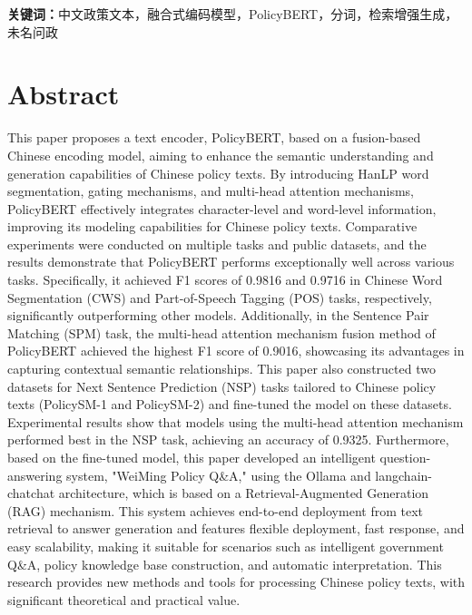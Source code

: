 \documentclass[12pt, a4paper]{ctexart}
\begin{document}
\vspace{2em} %

\textbf{关键词：}中文政策文本，融合式编码模型，PolicyBERT，分词，检索增强生成，未名问政
\vspace{2em} %

\newpage
\section*{Abstract}
This paper proposes a text encoder, PolicyBERT, based on a fusion-based Chinese encoding model, aiming to enhance the semantic understanding and generation capabilities of Chinese policy texts. By introducing HanLP word segmentation, gating mechanisms, and multi-head attention mechanisms, PolicyBERT effectively integrates character-level and word-level information, improving its modeling capabilities for Chinese policy texts. Comparative experiments were conducted on multiple tasks and public datasets, and the results demonstrate that PolicyBERT performs exceptionally well across various tasks. Specifically, it achieved F1 scores of 0.9816 and 0.9716 in Chinese Word Segmentation (CWS) and Part-of-Speech Tagging (POS) tasks, respectively, significantly outperforming other models. Additionally, in the Sentence Pair Matching (SPM) task, the multi-head attention mechanism fusion method of PolicyBERT achieved the highest F1 score of 0.9016, showcasing its advantages in capturing contextual semantic relationships. This paper also constructed two datasets for Next Sentence Prediction (NSP) tasks tailored to Chinese policy texts (PolicySM-1 and PolicySM-2) and fine-tuned the model on these datasets. Experimental results show that models using the multi-head attention mechanism performed best in the NSP task, achieving an accuracy of 0.9325. Furthermore, based on the fine-tuned model, this paper developed an intelligent question-answering system, "WeiMing Policy Q\&A," using the Ollama and langchain-chatchat architecture, which is based on a Retrieval-Augmented Generation (RAG) mechanism. This system achieves end-to-end deployment from text retrieval to answer generation and features flexible deployment, fast response, and easy scalability, making it suitable for scenarios such as intelligent government Q\&A, policy knowledge base construction, and automatic interpretation. This research provides new methods and tools for processing Chinese policy texts, with significant theoretical and practical value.
\end{document}
